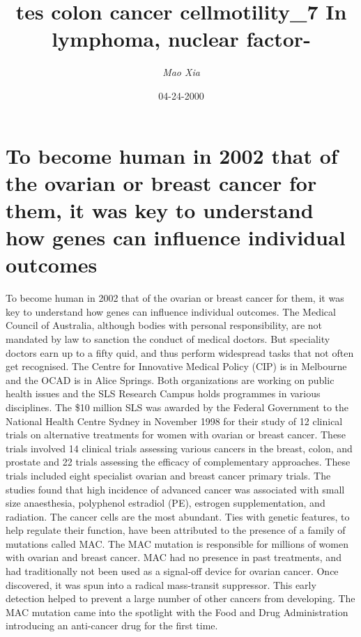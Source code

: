 \documentclass{article}%
\title{tes colon cancer cellmotility\_7 In lymphoma, nuclear factor{-}}%
\author{\textit{Mao Xia}}%
\date{04-24-2000}%
\begin{document}
%
\normalsize%
\maketitle%
\section{To become human in 2002 that of the ovarian or breast cancer for them, it was key to understand how genes can influence individual outcomes}%
\label{sec:Tobecomehumanin2002thatoftheovarianorbreastcancerforthem,itwaskeytounderstandhowgenescaninfluenceindividualoutcomes}%
To become human in 2002 that of the ovarian or breast cancer for them, it was key to understand how genes can influence individual outcomes. The Medical Council of Australia, although bodies with personal responsibility, are not mandated by law to sanction the conduct of medical doctors. But speciality doctors earn up to a fifty quid, and thus perform widespread tasks that not often get recognised.\newline%
The Centre for Innovative Medical Policy (CIP) is in Melbourne and the OCAD is in Alice Springs. Both organizations are working on public health issues and the SLS Research Campus holds programmes in various disciplines.\newline%
The \$10 million SLS was awarded by the Federal Government to the National Health Centre Sydney in November 1998 for their study of 12 clinical trials on alternative treatments for women with ovarian or breast cancer. These trials involved 14 clinical trials assessing various cancers in the breast, colon, and prostate and 22 trials assessing the efficacy of complementary approaches. These trials included eight specialist ovarian and breast cancer primary trials. The studies found that high incidence of advanced cancer was associated with small size anaesthesia, polyphenol estradiol (PE), estrogen supplementation, and radiation.\newline%
The cancer cells are the most abundant. Ties with genetic features, to help regulate their function, have been attributed to the presence of a family of mutations called MAC. The MAC mutation is responsible for millions of women with ovarian and breast cancer. MAC had no presence in past treatments, and had traditionally not been used as a signal{-}off device for ovarian cancer. Once discovered, it was spun into a radical mass{-}transit suppressor. This early detection helped to prevent a large number of other cancers from developing. The MAC mutation came into the spotlight with the Food and Drug Administration introducing an anti{-}cancer drug for the first time.\newline%
\end{document}
